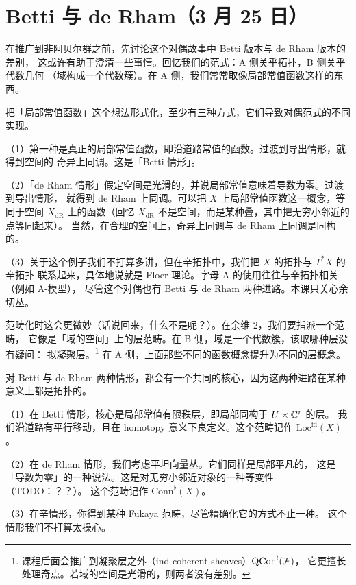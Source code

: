 \section[Betti 与 de Rham]{Betti 与 de Rham（3 月 25 日）}

在推广到非阿贝尔群之前，先讨论这个对偶故事中 Betti 版本与 de Rham 版本的差别，
这或许有助于澄清一些事情。回忆我们的范式：A 侧关乎拓扑，B 侧关乎代数几何
（域构成一个代数簇）。在 A 侧，我们常常取像局部常值函数这样的东西。

把「局部常值函数」这个想法形式化，至少有三种方式，它们导致对偶范式的不同实现。

（1）第一种是真正的局部常值函数，即沿道路常值的函数。过渡到导出情形，就得到空间的
奇异上同调。这是「Betti 情形」。

（2）「de Rham 情形」假定空间是光滑的，并说局部常值意味着导数为零。过渡到导出情形，
就得到 de Rham 上同调。可以把 $X$ 上局部常值函数这一概念，等同于空间 $X_{\mathrm{dR}}$
上的函数（回忆 $X_{\mathrm{dR}}$ 不是空间，而是某种叠，其中把无穷小邻近的点等同起来）。
当然，在合理的空间上，奇异上同调与 de Rham 上同调是同构的。

（3）关于这个例子我们不打算多讲，但在辛拓扑中，我们把 $X$ 的拓扑与 $T^*X$ 的辛拓扑
联系起来，具体地说就是 Floer 理论。字母 A 的使用往往与辛拓扑相关（例如 A-模型），
尽管这个对偶也有 Betti 与 de Rham 两种进路。本课只关心余切丛。

范畴化时这会更微妙（话说回来，什么不是呢？）。在余维 $2$，我们要指派一个范畴，
它像是「域的空间」上的层范畴。在 B 侧，域是一个代数簇，该取哪种层没有疑问：
拟凝聚层。\footnote{课程后面会推广到凝聚层之外（ind-coherent sheaves）$\mathrm{QCoh}^{!}(\mathcal{F})$，
它更擅长处理奇点。若域的空间是光滑的，则两者没有差别。}
在 A 侧，上面那些不同的函数概念提升为不同的层概念。

对 Betti 与 de Rham 两种情形，都会有一个共同的核心，因为这两种进路在某种意义上都是拓扑的。

（1）在 Betti 情形，核心是局部常值有限秩层，即局部同构于 $U\times\mathbb{C}^r$ 的层。
我们沿道路有平行移动，且在 homotopy 意义下良定义。这个范畴记作
$\mathrm{Loc}^{\mathrm{fd}}(X)$。

（2）在 de Rham 情形，我们考虑平坦向量丛。它们同样是局部平凡的，
这是「导数为零」的一种说法。这是对无穷小邻近对象的一种等变性（TODO：？？）。
这个范畴记作 $\mathrm{Conn}^{\flat}(X)$。

（3）在辛情形，你得到某种 Fukaya 范畴，尽管精确化它的方式不止一种。
这个情形我们不打算太操心。

